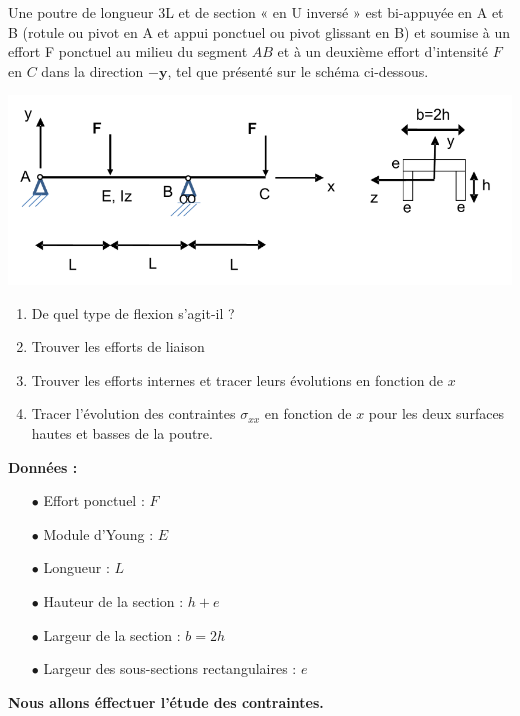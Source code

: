 \documentclass[lecture.tex]{subfiles}
\begin{document}

Une poutre de longueur 3L et de section « en U inversé » est bi-appuyée en A et B (rotule ou pivot en A et appui ponctuel ou pivot glissant en B) et soumise à un effort F ponctuel au milieu du segment $A B$ et à un deuxième effort d'intensité $F$ en $C$ dans la direction $-\mathbf{y}$, tel que présenté sur le schéma ci-dessous.

\begin{center}
  \includegraphics[scale=0.4]{figA0017.png}
\end{center}

\begin{enumerate}
  \item De quel type de flexion s’agit-il ?
  \item Trouver les efforts de liaison
  \item Trouver les efforts internes et tracer leurs évolutions en fonction de $x$
  \item Tracer l’évolution des contraintes $\sigma_{xx}$  en  fonction  de  $x$ pour  les  deux  surfaces hautes et basses de la poutre.
\end{enumerate}

\textbf{Données :}

\begin{itemize}
  \item[$\bullet$] Effort ponctuel : $F$
  \item[$\bullet$] Module d'Young : $E$
  \item[$\bullet$] Longueur : $L$
  \item[$\bullet$] Hauteur de la section : $h+e$
  \item[$\bullet$] Largeur de la section : $b=2h$
  \item[$\bullet$] Largeur des sous-sections rectangulaires : $e$
\end{itemize}

\medskip
\textbf{Nous allons éffectuer l'étude des contraintes.}
\end{document}
